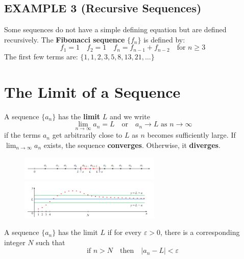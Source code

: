 \documentclass{article}
\theoremstyle{mystyle}
\begin{document}
\subsection*{EXAMPLE 3 (Recursive Sequences)}
Some sequences do not have a simple defining equation but are defined recursively. The \textbf{Fibonacci sequence} \(\{f_n\}\) is defined by:
\[ f_1 = 1 \quad f_2 = 1 \quad f_n = f_{n-1} + f_{n-2} \quad \text{for } n \ge 3 \]
The first few terms are: \(\{1, 1, 2, 3, 5, 8, 13, 21, \dots\}\)

\section*{The Limit of a Sequence}

\begin{tcolorbox}[colback=white, colframe=orange!80!white, title=Definition of a Limit of a Sequence (Intuitive), boxrule=0.5mm, arc=3mm]
A sequence \(\{a_n\}\) has the \textbf{limit} \(L\) and we write
\[ \lim_{n\to\infty} a_n = L \quad \text{or} \quad a_n \to L \text{ as } n \to \infty \]
if the terms \(a_n\) get arbitrarily close to \(L\) as \(n\) becomes sufficiently large. If \( \lim_{n\to\infty} a_n \) exists, the sequence \textbf{converges}. Otherwise, it \textbf{diverges}.
\end{tcolorbox}

\begin{figure}[htbp]
  \centering
  \includegraphics[width=0.6\textwidth]{graph67.png}
  \includegraphics[width=0.6\textwidth]{graph68.png}
\end{figure}

\begin{tcolorbox}[colback=white, colframe=orange!80!white, title=Definition of a Limit of a Sequence (Precise), boxrule=0.5mm, arc=3mm]
A sequence \(\{a_n\}\) has the limit \(L\) if for every \( \varepsilon > 0 \), there is a corresponding integer \(N\) such that
\[ \text{if } n > N \quad \text{then} \quad |a_n - L| < \varepsilon \]
\end{tcolorbox}
\end{document}

